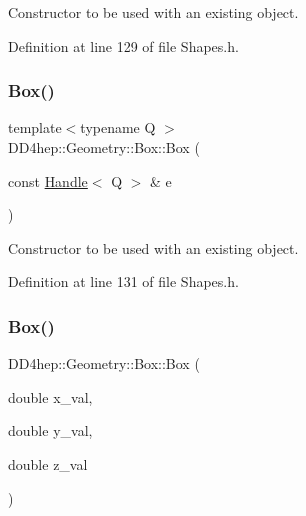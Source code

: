 Constructor to be used with an existing object. 



Definition at line 129 of file Shapes.\+h.

\hypertarget{class_d_d4hep_1_1_geometry_1_1_box_a4554b456409b6c51115ba0e04b32344c}{}\label{class_d_d4hep_1_1_geometry_1_1_box_a4554b456409b6c51115ba0e04b32344c} 
\subsubsection{\texorpdfstring{Box()}{Box()}\hspace{0.1cm}{\footnotesize\ttfamily [4/6]}}
{\footnotesize\ttfamily template$<$typename Q $>$ \\
D\+D4hep\+::\+Geometry\+::\+Box\+::\+Box (\begin{DoxyParamCaption}\item[{const \hyperlink{class_d_d4hep_1_1_handle}{Handle}$<$ Q $>$ \&}]{e }\end{DoxyParamCaption})\hspace{0.3cm}{\ttfamily [inline]}}



Constructor to be used with an existing object. 



Definition at line 131 of file Shapes.\+h.

\hypertarget{class_d_d4hep_1_1_geometry_1_1_box_a81ef6c7eef4559047f89d4cd7ab10ca8}{}\label{class_d_d4hep_1_1_geometry_1_1_box_a81ef6c7eef4559047f89d4cd7ab10ca8} 
\subsubsection{\texorpdfstring{Box()}{Box()}\hspace{0.1cm}{\footnotesize\ttfamily [5/6]}}
{\footnotesize\ttfamily D\+D4hep\+::\+Geometry\+::\+Box\+::\+Box (\begin{DoxyParamCaption}\item[{double}]{x\+\_\+val,  }\item[{double}]{y\+\_\+val,  }\item[{double}]{z\+\_\+val }\end{DoxyParamCaption})\hspace{0.3cm}{\ttfamily [inline]}}




